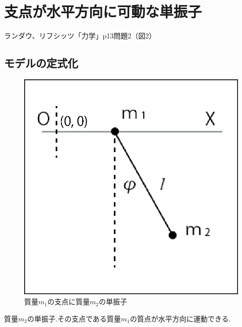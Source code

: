 \chapter{支点が水平方向に可動な単振子}

ランダウ、リフシッツ「力学」p13問題2（図2）

\section{モデルの定式化}

\begin{figure}[htbp]
  \begin{minipage}[b]{0.45\linewidth}
    \centering
    \includegraphics[keepaspectratio, scale=0.6]{eps/movableh.eps}
    \caption{質量$m_1$の支点に質量$m_2$の単振子}
  \end{minipage}
\end{figure}

質量$m_2$の単振子.その支点である質量$m_1$の質点が水平方向に運動できる.

